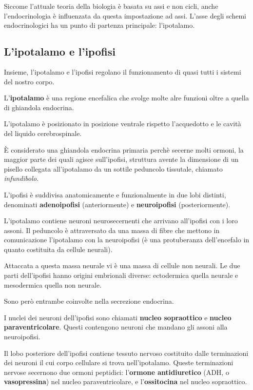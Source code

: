 \documentclass[]{article}
\begin{document}
Siccome l'attuale teoria della biologia è basata su assi e non cicli,
anche l'endocrinologia è influenzata da questa impostazione ad assi.
L'asse degli schemi endocrinologici ha un punto di partenza principale:
l'ipotalamo.

\subsection{L'ipotalamo e l'ipofisi}\label{lipotalamo-e-lipofisi}

Insieme, l'ipotalamo e l'ipofisi regolano il funzionamento di quasi
tutti i sistemi del nostro corpo.

L'\textbf{ipotalamo} è una regione encefalica che svolge molte alre
funzioni oltre a quella di ghiandola endocrina.

L'ipotalamo è posizionato in posizione ventrale rispetto l'acquedotto e
le cavità del liquido cerebrospinale.

È considerato una ghiandola endocrina primaria perchè secerne molti
ormoni, la maggior parte dei quali agisce sull'ipofisi, struttura avente
la dimensione di un pisello collegata all'ipotalamo da un sottile
peduncolo tissutale, chiamato \emph{infundibolo}.

L'ipofisi è suddivisa anatomicamente e funzionalmente in due lobi
distinti, denominati \textbf{adenoipofisi} (anteriormente) e
\textbf{neuroipofisi} (posteriormente).

L'ipotalamo contiene neuroni neurosecernenti che arrivano all'ipofisi
con i loro assoni. Il peduncolo è attraversato da una massa di fibre che
mettono in comunicazione l'ipotalamo con la neuroipofisi (è una
protuberanza dell'encefalo in quanto costituita da cellule neurali).

Attaccata a questa massa neurale vi è una massa di cellule non neurali.
Le due parti dell'ipofisi hanno origini embrionali diverse: ectodermica
quella neurale e mesodermica quella non neurale.

Sono però entrambe coinvolte nella secrezione endocrina.

I nuclei dei neuroni dell'ipofisi sono chiamati \textbf{nucleo
sopraottico} e \textbf{nucleo paraventricolare}. Questi contengono
neuroni che mandano gli assoni alla neuroipofisi.

Il lobo posteriore dell'ipofisi contiene tessuto nervoso costituito
dalle terminazioni dei neuroni il cui corpo cellulare si trova
nell'ipotalamo. Queste terminazioni nervose secernono due ormoni
peptidici: l'\textbf{ormone antidiuretico} (ADH, o
\textbf{vasopressina}) nel nucleo paraventricolare, e
l'\textbf{ossitocina} nel nucleo sopraottico.
\end{document}
